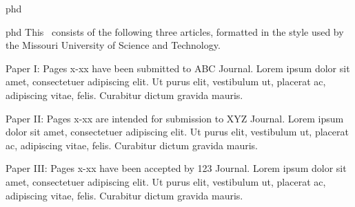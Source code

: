 \documentclass[times,12pt,titlepage]{mstogs}
\begin{document}

\begin{ThesisTitlePage}{phd}

\author{\MakeUppercase{Full Legal Name}}







\end{ThesisTitlePage}




\begin{ThesisPublicationOption}{phd}
  This \ThesisDissertationType\ consists of the following three
  articles, formatted in the style used by the Missouri University of
  Science and Technology.

  Paper I: Pages x-xx have been submitted to ABC Journal. Lorem ipsum
  dolor sit amet, consectetuer adipiscing elit. Ut purus elit,
  vestibulum ut, placerat ac, adipiscing vitae, felis. Curabitur
  dictum gravida mauris.

  Paper II: Pages x-xx are intended for submission to XYZ
  Journal. Lorem ipsum dolor sit amet, consectetuer adipiscing
  elit. Ut purus elit, vestibulum ut, placerat ac, adipiscing vitae,
  felis. Curabitur dictum gravida mauris.

  Paper III: Pages x-xx have been accepted by 123 Journal. Lorem ipsum
  dolor sit amet, consectetuer adipiscing elit. Ut purus elit,
  vestibulum ut, placerat ac, adipiscing vitae, felis. Curabitur
  dictum gravida mauris.

 \end{ThesisPublicationOption}

\end{document}
